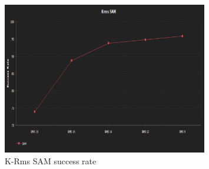 \documentclass{article}
\begin{document}
{                    \begin{figure}[h]
                        \centering
                        \includegraphics[width=0.8\textwidth]{Figures/krmsSamSuc.PNG}
                        \caption{K-Rms SAM success rate}
                        \label{fig:my_label}
                    \end{figure}
                    
}
\end{document}
